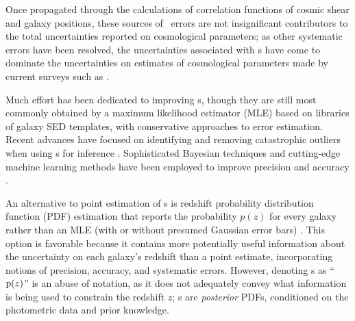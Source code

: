 

Once propagated through the calculations of correlation functions of cosmic shear and galaxy positions, these sources of \pz\ errors are not insignificant contributors to the total uncertainties reported on cosmological parameters; as other systematic errors have been resolved, the uncertainties associated with \pz s have come to dominate the uncertainties on estimates of cosmological parameters made by current surveys such as \des.

Much effort has been dedicated to improving \pz s, though they are still most commonly obtained by a maximum likelihood estimator (MLE) based on libraries of galaxy SED templates, with conservative approaches to error estimation.  
Recent advances have focused on identifying and removing catastrophic outliers when using \pz s for 
inference \citep{Gorecki2014}.  
Sophisticated Bayesian techniques and cutting-edge machine learning methods have been employed to improve precision \citep{Carliles2010} and accuracy \citep{Sadeh2015}. 

An alternative to point estimation of \pz s is redshift probability distribution function (PDF) estimation that reports the probability $p(z)$ for every galaxy rather than an MLE (with or without presumed Gaussian error bars) \citep{Koo1999}.  
This option is favorable because it contains more potentially useful information about the uncertainty on each galaxy's redshift than a point estimate, incorporating notions of precision, accuracy, and systematic errors.
However, denoting \pzpdf s as ``$\mathrm{p}(z)$'' is an abuse of notation, as it does not adequately convey what information is being used to constrain the redshift $z$; \pzpdf s are \textit{posterior} PDFs, conditioned on the photometric data and prior knowledge.

